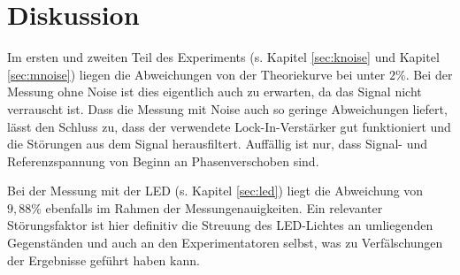 \section{Diskussion}

Im ersten und zweiten Teil des Experiments (s. Kapitel \ref{sec:knoise} und Kapitel \ref{sec:mnoise})
liegen die Abweichungen von der Theoriekurve bei unter $2 \%$.
Bei der Messung ohne Noise ist dies eigentlich auch zu erwarten, da das Signal nicht verrauscht ist.
Dass die Messung mit Noise auch so geringe Abweichungen liefert, lässt den Schluss zu,
dass der verwendete Lock-In-Verstärker gut funktioniert und die Störungen aus dem Signal herausfiltert.
Auffällig ist nur, dass Signal- und Referenzspannung von Beginn an Phasenverschoben sind.

Bei der Messung mit der LED (s. Kapitel \ref{sec:led}) liegt die Abweichung von $9,88 \%$ ebenfalls im Rahmen der
Messungenauigkeiten. Ein relevanter Störungsfaktor ist hier definitiv die Streuung des LED-Lichtes an
umliegenden Gegenständen und auch an den Experimentatoren selbst, was zu Verfälschungen der Ergebnisse
geführt haben kann.
